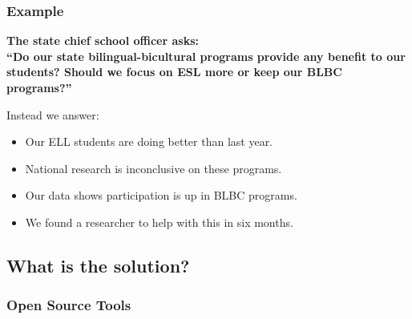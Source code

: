 \documentclass{beamer}
\begin{document}
\begin{frame}
\frametitle{Example}
\begin{center}
\textbf{The state chief school officer asks: \\ 
``Do our state bilingual-bicultural programs provide any benefit to our students? Should we focus on ESL more or keep our BLBC programs?''}
\end{center}
\vspace{.1in}
Instead we answer:
\begin{itemize}
  \item Our ELL students are doing better than last year.
  \item National research is inconclusive on these programs.
  \item Our data shows participation is up in BLBC programs.
  \item We found a researcher to help with this in six months.
\end{itemize}
\end{frame}


\subsection{What is the solution?}

{
\begin{frame}[plain]
\frametitle{Open Source Tools}
\end{frame}
}
\end{document}
